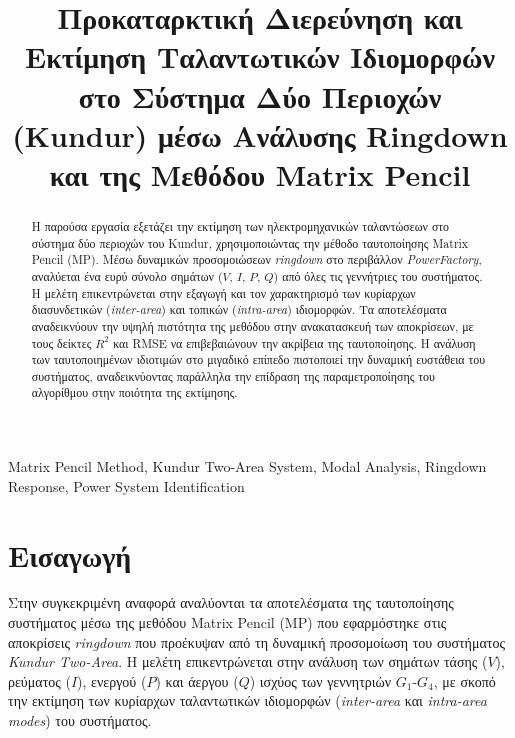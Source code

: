 \documentclass[conference]{IEEEtran}
\begin{document}
\title{Προκαταρκτική Διερεύνηση και Εκτίμηση Ταλαντωτικών Ιδιομορφών στο Σύστημα Δύο Περιοχών (Kundur) μέσω Ανάλυσης Ringdown και της Μεθόδου Matrix Pencil}

\author{
    \and
}
\maketitle

\begin{abstract}
Η παρούσα εργασία εξετάζει την εκτίμηση των ηλεκτρομηχανικών ταλαντώσεων στο σύστημα δύο περιοχών του Kundur, χρησιμοποιώντας την μέθοδο ταυτοποίησης Matrix Pencil (MP). Μέσω δυναμικών προσομοιώσεων \textit{ringdown} στο περιβάλλον \textit{PowerFactory}, αναλύεται ένα ευρύ σύνολο σημάτων ($V$, $I$, $P$, $Q$) από όλες τις γεννήτριες του συστήματος. Η μελέτη επικεντρώνεται στην εξαγωγή και τον χαρακτηρισμό των κυρίαρχων διασυνδετικών (\textit{inter-area}) και τοπικών (\textit{intra-area}) ιδιομορφών. Τα αποτελέσματα αναδεικνύουν την υψηλή πιστότητα της μεθόδου στην ανακατασκευή των αποκρίσεων, με τους δείκτες $R^2$ και RMSE να επιβεβαιώνουν την ακρίβεια της ταυτοποίησης. Η ανάλυση των ταυτοποιημένων ιδιοτιμών στο μιγαδικό επίπεδο πιστοποιεί την δυναμική ευστάθεια του συστήματος, αναδεικνύοντας παράλληλα την επίδραση της παραμετροποίησης του αλγορίθμου στην ποιότητα της εκτίμησης.
\end{abstract}

\begin{IEEEkeywords}
Matrix Pencil Method, Kundur Two-Area System, Modal Analysis, Ringdown Response, Power System Identification
\end{IEEEkeywords}

\section{Εισαγωγή}
Στην συγκεκριμένη αναφορά αναλύονται τα αποτελέσματα της ταυτοποίησης συστήματος μέσω της μεθόδου Matrix Pencil (MP) που εφαρμόστηκε στις αποκρίσεις \textit{ringdown} που προέκυψαν από τη δυναμική προσομοίωση του συστήματος \textit{Kundur Two-Area}\cite{prabha2019}. Η μελέτη επικεντρώνεται στην ανάλυση των σημάτων τάσης ($V$), ρεύματος ($I$), ενεργού ($P$) και άεργου ($Q$) ισχύος των γεννητριών $G_1$-$G_4$, με σκοπό την εκτίμηση των κυρίαρχων ταλαντωτικών ιδιομορφών (\textit{inter-area} και \textit{intra-area modes}) του συστήματος.
\end{document}
